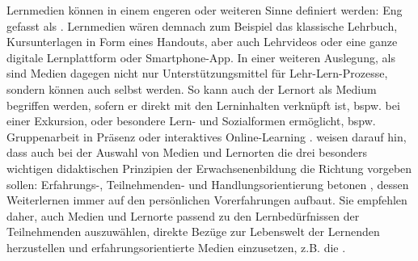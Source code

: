 \documentclass[
  twoside,
  parskip=half-,
]{scrreprt}
\begin{document}
Lernmedien können in einem engeren oder weiteren Sinne definiert werden: Eng gefasst als . Lernmedien wären demnach zum Beispiel das klassische Lehrbuch, Kursunterlagen in Form eines Handouts, aber auch Lehrvideos oder eine ganze digitale Lernplattform oder Smartphone-App. In einer weiteren Auslegung, als  sind Medien dagegen nicht nur Unterstützungsmittel für Lehr-Lern-Prozesse, sondern können auch selbst  werden. So kann auch der Lernort als Medium begriffen werden, sofern er direkt mit den Lerninhalten verknüpft ist, bspw. bei einer Exkursion, oder besondere Lern- und Sozialformen ermöglicht, bspw. Gruppenarbeit in Präsenz oder interaktives Online-Learning \autocite[vgl.][102]{schlutz}. \citeauthor{reich-claassen} weisen darauf hin, dass auch bei der Auswahl von Medien und Lernorten die drei besonders wichtigen didaktischen Prinzipien der Erwachsenenbildung die Richtung vorgeben sollen: Erfahrungs-, Teilnehmenden- und Handlungsorientierung betonen , dessen Weiterlernen immer auf den persönlichen Vorerfahrungen aufbaut. Sie empfehlen daher, auch Medien und Lernorte passend zu den Lernbedürfnissen der Teilnehmenden auszuwählen, direkte Bezüge zur Lebenswelt der Lernenden herzustellen und erfahrungsorientierte Medien einzusetzen, z.B. die .
\end{document}
